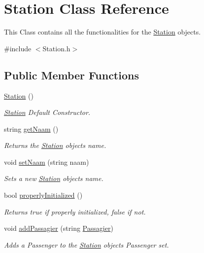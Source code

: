 \hypertarget{classStation}{}\section{Station Class Reference}
\label{classStation}


This Class contains all the functionalities for the \hyperlink{classStation}{Station} objects.  




{\ttfamily \#include $<$Station.\+h$>$}

\subsection*{Public Member Functions}
\begin{DoxyCompactItemize}
\item 
\hyperlink{classStation_a73d335726aad1d844d81cda6d9fd74e6}{Station} ()
\begin{DoxyCompactList}\small\item\em \hyperlink{classStation}{Station} Default Constructor. \end{DoxyCompactList}\item 
string \hyperlink{classStation_a7db91849f0d5bab0a4ac0aa4967721cf}{get\+Naam} ()
\begin{DoxyCompactList}\small\item\em Returns the \hyperlink{classStation}{Station} object\textquotesingle{}s name. \end{DoxyCompactList}\item 
void \hyperlink{classStation_a9838301eaa0d45561877bcebc19a663c}{set\+Naam} (string naam)
\begin{DoxyCompactList}\small\item\em Sets a new \hyperlink{classStation}{Station} object\textquotesingle{}s name. \end{DoxyCompactList}\item 
bool \hyperlink{classStation_aab182a50a2992afe0df4412f7de4b73d}{properly\+Initialized} ()
\begin{DoxyCompactList}\small\item\em Returns true if properly initialized, false if not. \end{DoxyCompactList}\item 
void \hyperlink{classStation_a9584a65058bdf75254e3a2d79ddcdba1}{add\+Passagier} (string \hyperlink{classPassagier}{Passagier})
\begin{DoxyCompactList}\small\item\em Adds a Passenger to the \hyperlink{classStation}{Station} object\textquotesingle{}s Passenger set. \end{DoxyCompactList}\item 

\end{DoxyCompactItemize}
